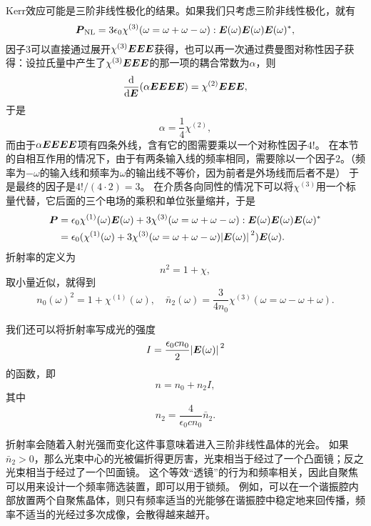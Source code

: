 Kerr效应可能是三阶非线性极化的结果。如果我们只考虑三阶非线性极化，就有
\[
    \vb*{P}_\text{NL} = 3 \epsilon_0 \chi^{(3)}(\omega=\omega + \omega - \omega) : \vb*{E}(\omega) \vb*{E}(\omega) \vb*{E}(\omega)^*,
\]
因子$3$可以直接通过展开$\chi^{(3)} \vb*{E} \vb*{E} \vb*{E}$获得，也可以再一次通过费曼图对称性因子获得：设拉氏量中产生了$\chi^{(3)} \vb*{E} \vb*{E} \vb*{E}$的那一项的耦合常数为$\alpha$，则
\[
    \dv{\vb*{E}} (\alpha \vb*{E} \vb*{E} \vb*{E} \vb*{E}) = \chi^{(2)} \vb*{E} \vb*{E} \vb*{E},
\]
于是
\[
    \alpha = \frac{1}{4} \chi^{(2)},
\]
而由于$\alpha \vb*{E} \vb*{E} \vb*{E} \vb*{E}$项有四条外线，含有它的图需要乘以一个对称性因子$4!$。
在本节的自相互作用的情况下，由于有两条输入线的频率相同，需要除以一个因子$2$。（频率为$-\omega$的输入线和频率为$\omega$的输出线不等价，因为前者是外场线而后者不是）
于是最终的因子是$4! / (4 \cdot 2) = 3$。
在介质各向同性的情况下可以将$\chi^{(3)}$用一个标量代替，它后面的三个电场的乘积和单位张量缩并，于是
\[
    \begin{aligned}
        \vb*{P} &= \epsilon_0 \chi^{(1)}(\omega) \vb*{E}(\omega) +  3 \chi^{(3)}(\omega=\omega + \omega - \omega) : \vb*{E}(\omega) \vb*{E}(\omega) \vb*{E}(\omega)^* \\
        &= \epsilon_0 (\chi^{(1)}(\omega) + 3 \chi^{(3)}(\omega=\omega+\omega-\omega) \abs*{\vb*{E}(\omega)}^2) \vb*{E}(\omega).
    \end{aligned}
\]
折射率的定义为
\[
    n^2 = 1 + \chi,
\]
取小量近似，就得到
\begin{equation}
    n_0(\omega)^2 = 1 + \chi^{(1)}(\omega), \quad \bar{n}_2(\omega) = \frac{3}{4n_0} \chi^{(3)}(\omega=\omega-\omega+\omega).
\end{equation}

我们还可以将折射率写成光的强度
\begin{equation}
    I = \frac{\epsilon_0 c n_0}{2} \abs*{\vb*{E}(\omega)}^2
\end{equation}
的函数，即
\begin{equation}
    n = n_0 + n_2 I,
    \label{eq:reflective-index-indensity-dependence}
\end{equation}
其中
\begin{equation}
    n_2 = \frac{4}{\epsilon_0 c n_0} \bar{n}_2.
\end{equation}

折射率会随着入射光强而变化这件事意味着进入三阶非线性晶体的光会。
如果$\bar{n}_2 > 0$，那么光束中心的光被偏折得更厉害，光束相当于经过了一个凸面镜；反之光束相当于经过了一个凹面镜。
这个等效“透镜”的行为和频率相关，因此自聚焦可以用来设计一个频率筛选装置，即可以用于锁频。
例如，可以在一个谐振腔内部放置两个自聚焦晶体，则只有频率适当的光能够在谐振腔中稳定地来回传播，频率不适当的光经过多次成像，会散得越来越开。

